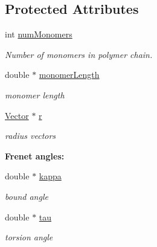 \subsection*{Protected Attributes}
\begin{DoxyCompactItemize}
\item 
int \hyperlink{class_p_c_a_1_1_polymer_a8dadd2d6d6d65b79909f274acd63fd1e}{num\+Monomers}
\begin{DoxyCompactList}\small\item\em Number of monomers in polymer chain. \end{DoxyCompactList}\item 
double $\ast$ \hyperlink{class_p_c_a_1_1_polymer_adec33c5274834c85479abefe537efa5a}{monomer\+Length}
\begin{DoxyCompactList}\small\item\em monomer length \end{DoxyCompactList}\item 
\hyperlink{class_p_c_a_1_1_vector}{Vector} $\ast$ \hyperlink{class_p_c_a_1_1_polymer_a9822e3b9c3420a04a689706b84e586ca}{r}
\begin{DoxyCompactList}\small\item\em radius vectors \end{DoxyCompactList}\end{DoxyCompactItemize}
\begin{Indent}{\bf Frenet angles\+:}\par
\begin{DoxyCompactItemize}
\item 
double $\ast$ \hyperlink{class_p_c_a_1_1_polymer_a1bef29f1613bb4b67981aae7df3d804b}{kappa}
\begin{DoxyCompactList}\small\item\em bound angle \end{DoxyCompactList}\item 
double $\ast$ \hyperlink{class_p_c_a_1_1_polymer_ab3b07298bdbac01a7b20b2554d7b248f}{tau}
\begin{DoxyCompactList}\small\item\em torsion angle \end{DoxyCompactList}\end{DoxyCompactItemize}
\end{Indent}
